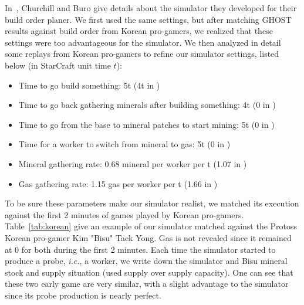 \documentclass[journal]{IEEEtran}
\newcommand{\ghost}{\textsc{GHOST}\xspace}
\newcommand{\ie}{\textit{i.e.}}
\begin{document}
In~\cite{ChurchillB11},  Churchill and  Buro  give  details about  the
simulator they developed for their  build order planer.  We first used
the same  settings, but  after matching  \ghost results  against build
order from Korean pro-gamers, we realized that these settings were too
advantageous  for the  simulator.   We then  analyzed  in detail  some
replays  from  Korean pro-gamers  to  refine  our simulator  settings,
listed below (in StarCraft unit time $t$):
\begin{itemize}
\item Time to go build something: 5t (4t in \cite{ChurchillB11})
\item Time to go back  gathering minerals after building something: 4t
  (0 in \cite{ChurchillB11})
\item Time to go from the base  to mineral patches to start mining: 5t
  (0 in \cite{ChurchillB11})
\item  Time for  a worker  to  switch from  mineral  to gas:  5t (0  in
  \cite{ChurchillB11})
\item Mineral gathering  rate: 0.68 mineral per worker per  t (1.07 in
  \cite{ChurchillB11})
\item  Gas  gathering  rate:  1.15  gas per  worker  per  t  (1.66  in
  \cite{ChurchillB11})
\end{itemize}  
To be sure these parameters make our simulator realist, we matched its
execution  against the  first  2  minutes of  games  played by  Korean
pro-gamers. Table~\ref{tab:korean}  give an  example of  our simulator
matched against the Protoss Korean pro-gamer Kim "Bisu" Taek Yong. Gas
is not  revealed since it  remained at 0 for  both during the  first 2
minutes. Each  time the simulator started  to produce a probe,  \ie, a
worker, we write down the simulator  and Bisu mineral stock and supply
situation (used supply  over supply capacity). One can  see that these
two  early game  are  very similar,  with a  slight  advantage to  the
simulator since its probe production is nearly perfect.
\end{document}
